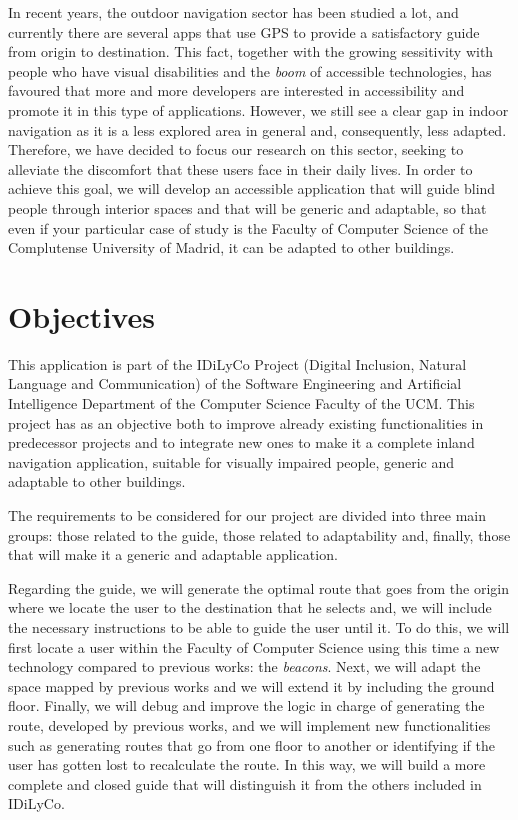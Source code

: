 In recent years, the outdoor navigation sector has been studied a lot, and currently there are several apps that use GPS to provide a satisfactory guide from origin to destination. This fact, together with the growing sessitivity with people who have visual disabilities and the \textit{boom} of accessible technologies, has favoured that more and more developers are interested in accessibility and promote it in this type of applications. However, we still see a clear gap in indoor navigation as it is a less explored area in general and, consequently, less adapted. Therefore, we have decided to focus our research on this sector, seeking to alleviate the discomfort that these users face in their daily lives. In order to achieve this goal, we will develop an accessible application that will guide blind people through interior spaces and that will be generic and adaptable, so that even if your particular case of study is the Faculty of Computer Science of the Complutense University of Madrid, it can be adapted to other buildings. 


\section{Objectives}
\label{sec:objectives}
This application is part of the IDiLyCo Project (Digital Inclusion, Natural Language and Communication) of the
Software Engineering and Artificial Intelligence Department of the Computer Science Faculty of the UCM. This project has
as an objective both to improve already existing functionalities in predecessor projects and to integrate new ones to make it a complete inland navigation application, suitable for visually impaired people, generic and adaptable to other buildings.

The requirements to be considered for our project are divided into three main groups: those related to the guide, those related to adaptability and, finally, those that will make it a generic and adaptable application.

Regarding the guide, we will generate the optimal route that goes from the origin where we locate the user to the destination that he selects and, we will include the necessary instructions to be able to guide the user until it. To do this, we will first locate a user within the Faculty of Computer Science using this time a new technology compared to previous works: the \textit{beacons}. Next, we will adapt the space mapped by previous works and we will extend it by including the ground floor. Finally, we will debug and improve the logic in charge of generating the route, developed by previous works, and we will implement new functionalities such as generating routes that go from one floor to another or identifying if the user has gotten lost to recalculate the route. In this way, we will build a more complete and closed guide that will distinguish it from the others included in IDiLyCo.

